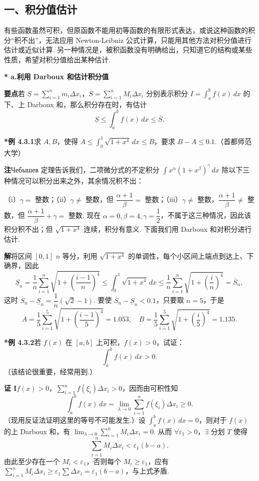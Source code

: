 \documentclass[UTF8, 12pt, fontset=fandol, oneside]{ctexart}
\begin{document}
\subsection*{一、积分值估计}

有些函数虽然可积，但原函数不能用初等函数的有限形式表达，或说这种函数的积分“积不出”，无法应用 Newton-Leibniz 公式计算，只能用其他方法对积分值进行估计或近似计算. 另一种情况是，被积函数没有明确给出，只知道它的结构或某些性质，希望对积分值给出某种估计.

\noindent\textbf{* a.\quad 利用 Darboux 和估计积分值}

\noindent\textbf{要点}\quad 若 $\underline S=\sum_{i=1}^n m_i\Delta x_i$，$\overline S=\sum_{i=1}^n M_i\Delta x_i$ 分别表示积分 $I=\int_a^b f(x)\,dx$ 的下、上 Darboux 和，那么积分存在时，有估计
\[
\underline S\le\int_a^b f(x)\,dx\le\overline S.
\]

\noindent\textbf{*例 4.3.1}\quad 求 $A,B$，使得 $A\le\int_0^1\sqrt{1+x^4}\,dx\le B$，要求 $B-A\le0.1$.（首都师范大学）

\noindent\textbf{注}\quad Чебышев 定理告诉我们，二项微分式的不定积分 $\int x^\alpha(1+x^\beta)^\gamma\,dx$ 除以下三种情况可以积分出来之外，其余情况积不出：

（i）$\gamma=$ 整数；（ii）$\gamma\ne$ 整数，但 $\dfrac{\alpha+1}{\beta}=$ 整数；（iii）$\gamma\ne$ 整数，$\dfrac{\alpha+1}{\beta}\ne$ 整数，但 $\dfrac{\alpha+1}{\beta}+\gamma=$ 整数. 现在 $\alpha=0,\beta=4,\gamma=\dfrac12$，不属于这三种情况，因此该积分积不出；但 $\sqrt{1+x^4}$ 连续，积分有意义. 下面我们用 Darboux 和对积分进行估计.

\noindent\textbf{解}\quad 将区间 $[0,1]$ $n$ 等分，利用 $\sqrt{1+x^4}$ 的单调性，每个小区间上端点到达上、下确界，因此
\[
\underline S_n=\frac1n\sum_{i=1}^n\sqrt{1+\left(\frac{i-1}{n}\right)^4}
\le\int_0^1\sqrt{1+x^4}\,dx
\le\frac1n\sum_{i=1}^n\sqrt{1+\left(\frac in\right)^4}
=\overline S_n,
\]
这时 $\overline S_n-\underline S_n=\dfrac1n(\sqrt2-1)$. 要使 $\overline S_n-\underline S_n<0.1$，只要取 $n=5$，于是
\[
A=\frac15\sum_{i=1}^5\sqrt{1+\left(\frac{i-1}{5}\right)^4}=1.053,\quad
B=\frac15\sum_{i=1}^5\sqrt{1+\left(\frac i5\right)^4}=1.135.
\]

\noindent\textbf{*例 4.3.2}\quad 若 $f(x)$ 在 $[a,b]$ 上可积，$f(x)>0$，试证：
\[
\int_a^b f(x)\,dx>0.
\]
（该结论很重要，经常用到.）

\noindent\textbf{证 I}\quad $f(x)>0$，$\sum_{i=1}^n f(\xi_i)\Delta x_i>0$，因而由可积性知
\[
\int_a^b f(x)\,dx=\lim_{\lambda\to0}\sum_{i=1}^n f(\xi_i)\Delta x_i\ge0.
\]
（现用反证法证明这里的等号不可能发生.）设 $\int_a^b f(x)\,dx=0$，则对于 $f(x)$ 的上 Darboux 和，有 $\lim_{\lambda\to0}\sum_{i=1}^n M_i\Delta x_i=0$. 从而 $\forall\varepsilon_1>0$，$\exists$ 分划 $T$ 使得
\[
\sum_{i=1}^nM_i\Delta x_i<\varepsilon_1(b-a).
\]
由此至少存在一个 $M_i<\varepsilon_1$，否则每个 $M_i\ge\varepsilon_1$，应有 $\sum_{i=1}^nM_i\Delta x_i\ge\varepsilon_1\sum\Delta x_i=\varepsilon_1(b-a)$，与上式矛盾.
\end{document}
